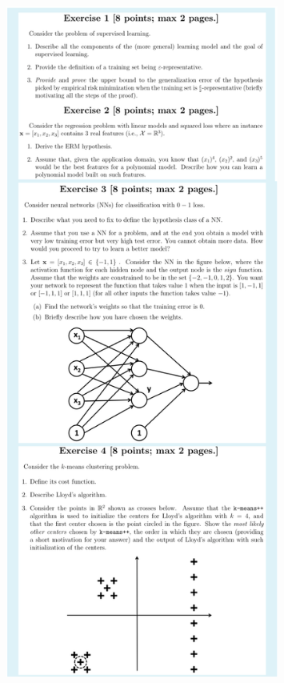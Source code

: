 \documentclass[a4paper,11pt,oneside]{book}
\begin{document}
\begin{figure}[H]
    \centering
    \includegraphics[width=0.8\textwidth,height=0.8\textheight,keepaspectratio]{images/1_Feb_22.png}
\end{figure}
\clearpage
\end{document}
